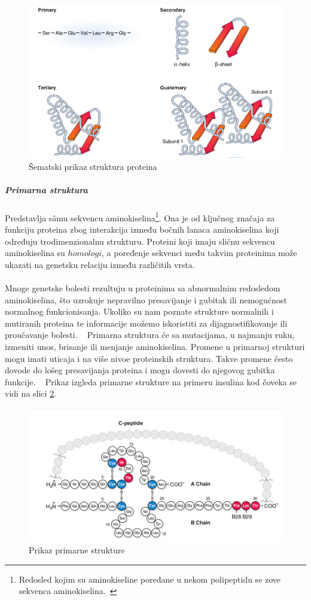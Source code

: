 \documentclass[a4paper]{article}
\begin{document}
\begin{figure}[h]
	\centering
    \includegraphics[width=1\textwidth]{Pictures/structure_schema.png}
    \caption{Šematski prikaz struktura proteina~\cite{bmbg}}
    \label{fig:structures2}
\end{figure}
\subparagraph{Primarna struktura}
Predstavlja s\^amu sekvencu aminokiselina\footnote{Redosled kojim su aminokiseline poređane u nekom polipeptidu se zove sekvenca aminokiselina.~\cite{spasic}}. Ona je od ključnog značaja za funkciju proteina zbog interakcija između bočnih lanaca aminokiselina koji određuju trodimenzionalnu strukturu. Proteini koji imaju sličnu sekvencu aminokiselina su $homologi$, a poređenje sekvenci među takvim proteinima može ukazati na genetsku relaciju između različitih vrsta.\\\\
Mnoge genetske bolesti rezultuju u proteinima sa abnormalnim redosledom aminokiselina, što uzrokuje nepravilno presavijanje i gubitak ili nemogućnost normalnog funkcionisanja. Ukoliko su nam poznate strukture normalnih i mutiranih proteina te informacije možemo iskoristiti za dijagnostifikovanje ili proučavanje bolesti. ~\cite{lippincott} Primarna struktura će sa mutacijama, u najmanju ruku, izmeniti unos, brisanje ili menjanje aminokiselina. Promene u primarnoj strukturi mogu imati uticaja i na više nivoe proteinskih struktura. Takve promene često dovode do lošeg presavijanja proteina i mogu dovesti do njegovog gubitka funkcije. ~\cite{flash}
Prikaz izgleda primarne strukture na primeru insulina kod čoveka se vidi na slici \ref{fig:insulin}.
\begin{figure}[h]
	\centering
    \includegraphics[width=1\textwidth]{Pictures/insulin.png}
    \caption{Prikaz primarne strukture~\cite{bmbg}}
    \label{fig:insulin}
\end{figure}
\end{document}
